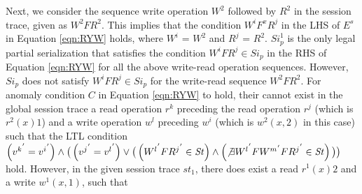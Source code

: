 \documentclass{sig-alternate-05-2015}
\begin{document}
  Next, we consider the sequence write operation $W^2$ followed by $R^2$ in the session trace, given as $W^2 F R^2$.
  This implies that the condition $W^i F^x R^j$ in the LHS of $E^{s}$ in Equation \ref{eqn:RYW} holds, where $W^i$ = $W^2$ and
  $R^j$ = $R^2$. $\mathit{Si}_p^1$ is the only legal partial serialization that satisfies the condition $W^i F R^j \in \mathit{Si}_p$
   in the RHS of Equation \ref{eqn:RYW} for all the above write-read operation sequences. However, $\mathit{Si}_p$ does not satisfy
  $W^i F R^j \in \mathit{Si}_p$ for the write-read sequence $W^2 F R^2$.
  For anomaly
  condition $C$  in Equation \ref{eqn:RYW} to hold, their cannot exist in the global session trace a read operation $r^k$ preceding the read operation
  $r^j$ (which is $r^2(x){1}$) and a write operation $w^l$ preceding $w^i$ (which is $w^2(x,2)$ in this case)
   such that the LTL condition $\left(  {v^k}^{'} = {v^i}^{'} \right) \wedge \big(\left( {v^j}^{'} = {v^l}^{'} \right) \vee
\big( \left( {W^l}^{'} F {R^j}^{'} \in \mathit{St} \right) \wedge \left( \not\exists {W^l}^{'} F {W^m}^{'} F {R^j}^{'} \in \mathit{St} \right) \big) \big)$ hold.
However, in the given session trace  $\mathit{st}_1$, there does exist a read $r^1(x){2}$ and a write $w^1(x,1)$, such that
\end{document}
